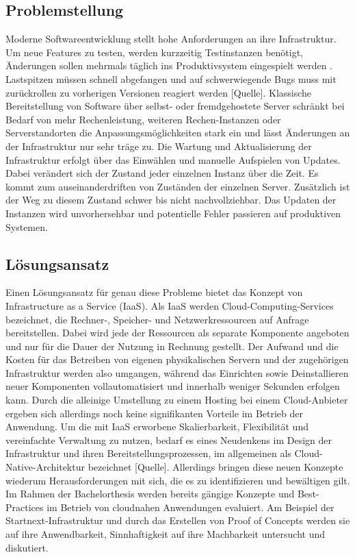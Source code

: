 \documentclass[11pt]{scrartcl}
\begin{document}
\subsection{Problemstellung}
Moderne Softwareentwicklung stellt hohe Anforderungen an ihre Infrastruktur. Um neue Features zu testen, werden kurzzeitig Testinstanzen benötigt, Änderungen sollen mehrmals täglich ins Produktivsystem eingespielt werden \cite{IBM:2019}. Lastspitzen müssen schnell abgefangen und auf schwerwiegende Bugs muss mit zurückrollen zu vorherigen Versionen reagiert werden [Quelle]. Klassische Bereitstellung von Software über selbst- oder fremdgehostete Server schränkt bei Bedarf von mehr Rechenleistung, weiteren Rechen-Instanzen oder Serverstandorten die Anpassungsmöglichkeiten stark ein und lässt Änderungen an der Infrastruktur nur sehr träge zu. \newline 
Die Wartung und Aktualisierung der Infrastruktur erfolgt über das Einwählen und manuelle Aufspielen von Updates. Dabei verändert sich der Zustand jeder einzelnen Instanz über die Zeit. Es kommt zum auseinanderdriften von Zuständen der einzelnen Server. Zusätzlich ist der Weg zu diesem Zustand schwer bis nicht nachvollziehbar. Das Updaten der Instanzen wird unvorhersehbar und potentielle Fehler passieren auf produktiven Systemen.

\subsection{Lösungsansatz}
Einen Lösungsansatz für genau diese Probleme bietet das Konzept von Infrastructure as a Service (IaaS). Als IaaS werden Cloud-Computing-Services bezeichnet, die Rechner-, Speicher- und Netzwerkressourcen auf Anfrage bereitstellen. Dabei wird jede der Ressourcen als separate Komponente angeboten und nur für die Dauer der Nutzung in Rechnung gestellt. Der Aufwand und die Kosten für das Betreiben von eigenen physikalischen Servern und der zugehörigen Infrastruktur werden also umgangen, während das Einrichten sowie Deinstallieren neuer Komponenten vollautomatisiert und innerhalb weniger Sekunden erfolgen kann.\newline
Durch die alleinige Umstellung zu einem Hosting bei einem Cloud-Anbieter ergeben sich allerdings noch keine signifikanten Vorteile im Betrieb der Anwendung. Um die mit IaaS erworbene Skalierbarkeit, Flexibilität und vereinfachte Verwaltung zu nutzen, bedarf es eines Neudenkens im Design der Infrastruktur und ihren Bereitstellungsprozessen, im allgemeinen als Cloud-Native-Architektur bezeichnet [Quelle]. Allerdings bringen diese neuen Konzepte wiederum Herausforderungen mit sich, die es zu identifizieren und bewältigen gilt. \newline 
Im Rahmen der Bachelorthesis werden bereits gängige Konzepte und \glqq Best-Practices\grqq{} im Betrieb von cloudnahen Anwendungen evaluiert. Am Beispiel der Startnext-Infrastruktur und durch das Erstellen von Proof of Concepts werden sie auf ihre Anwendbarkeit, Sinnhaftigkeit auf ihre Machbarkeit untersucht und diskutiert.
\end{document}
